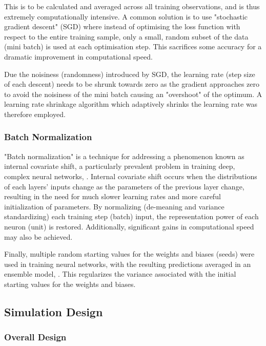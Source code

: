 \documentclass[a4paper]{article}
\begin{document}
This is to be calculated and averaged across all training observations, and is thus extremely computationally intensive. A common solution is to use "stochastic gradient descent" (SGD) where instead of optimising the loss function with respect to the entire training sample, only a small, random subset of the data (mini batch) is used at each optimisation step. This sacrifices some accuracy for a dramatic improvement in computational speed.

Due the noisiness (randomness) introduced by SGD, the learning rate (step size of each descent) needs to be shrunk towards zero as the gradient approaches zero to avoid the noisiness of the mini batch causing an "overshoot" of the optimum. A learning rate shrinkage algorithm which adaptively shrinks the learning rate was therefore employed.

\subsubsection{Batch Normalization}

"Batch normalization" is a technique for addressing a phenomenon known as internal covariate shift, a particularly prevalent problem in training deep, complex neural networks, \citep{ioffe_batch_2015}. Internal covariate shift occurs when the distributions of each layers' inputs change as the parameters of the previous layer change, resulting in the need for much slower learning rates and more careful initialization of parameters. By normalizing (de-meaning and variance standardizing) each training step (batch) input, the representation power of each neuron (unit) is restored. Additionally, significant gains in computational speed may also be achieved.

Finally, multiple random starting values for the weights and biases (seeds) were used in training neural networks, with the resulting predictions averaged in an ensemble model, \cite{hansen_neural_1990}. This regularizes the variance associated with the initial starting values for the weights and biases. 

\subsection{Simulation Design}

\subsubsection{Overall Design}
\end{document}
